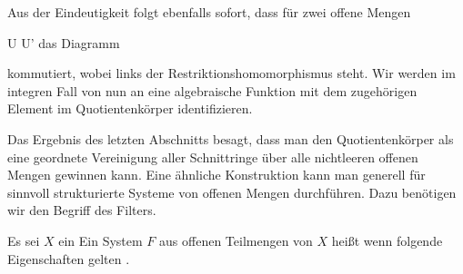 Aus der Eindeutigkeit folgt ebenfalls sofort, dass für zwei offene Mengen

\mavergleichskette
{\vergleichskette
{ U
}
{ \subseteq }{ U'
}
{  }{
}
{    }{
}
{   }{
}
}
{}{}{}
das Diagramm

 {  }

kommutiert, wobei links der Restriktionshomomorphismus steht. Wir werden im integren Fall von nun an eine algebraische Funktion mit dem zugehörigen Element im Quotientenkörper identifizieren.






Das Ergebnis des letzten Abschnitts besagt, dass man den Quotientenkörper als eine geordnete Vereinigung aller Schnittringe
 über alle nichtleeren offenen Mengen gewinnen kann. Eine ähnliche Konstruktion kann man generell für sinnvoll strukturierte Systeme von offenen Mengen durchführen. Dazu benötigen wir den Begriff des Filters.


{}
{





Es sei $X$ ein
Ein System $F$ aus offenen Teilmengen von $X$ heißt  wenn folgende Eigenschaften gelten
 {} {.}





}

